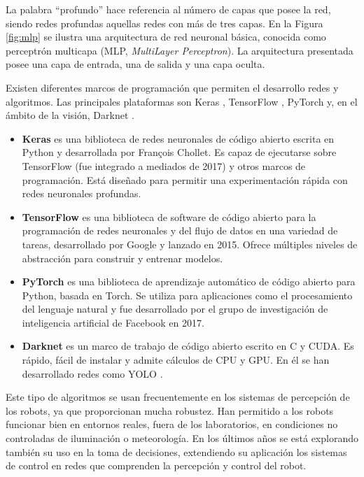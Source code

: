 \documentclass[../main.tex]{subfiles}
\begin{document}
La palabra ``profundo'' hace referencia al número de capas que posee la red, siendo redes profundas aquellas redes con más de tres capas. En la Figura \ref{fig:mlp} se ilustra una arquitectura de red neuronal básica, conocida como perceptrón multicapa (MLP, \emph{MultiLayer Perceptron}). La arquitectura presentada posee una capa de entrada, una de salida y una capa oculta.

Existen diferentes marcos de programación que permiten el desarrollo redes y algoritmos. Las principales plataformas son Keras \cite{keras}, TensorFlow \cite{tensorflow}, PyTorch \cite{pytorch} y, en el ámbito de la visión, Darknet \cite{darknet13}.

\begin{itemize}
    \item \textbf{Keras} es una biblioteca de redes neuronales de código abierto escrita en Python y desarrollada por François Chollet. Es capaz de ejecutarse sobre TensorFlow (fue integrado a mediados de 2017) y otros marcos de programación. Está diseñado para permitir una experimentación rápida con redes neuronales profundas.
    \item \textbf{TensorFlow} es una biblioteca de software de código abierto para la programación de redes neuronales y del flujo de datos en una variedad de tareas, desarrollado por Google y lanzado en 2015. Ofrece múltiples niveles de abstracción para construir y entrenar modelos.
    \item \textbf{PyTorch} es una biblioteca de aprendizaje automático de código abierto para Python, basada en Torch. Se utiliza para aplicaciones como el procesamiento del lenguaje natural y fue desarrollado por el grupo de investigación de inteligencia artificial de Facebook en 2017.
    \item \textbf{Darknet} es un marco de trabajo de código abierto escrito en C y CUDA. Es rápido, fácil de instalar y admite cálculos de CPU y GPU. En él se han desarrollado redes como YOLO \cite{yolov3}.
\end{itemize}

Este tipo de algoritmos se usan frecuentemente en los sistemas de percepción de los robots, ya que proporcionan mucha robustez. Han permitido a los robots funcionar bien en entornos reales, fuera de los laboratorios, en condiciones no controladas de iluminación o meteorología. En los últimos años se está explorando también su uso en la toma de decisiones, extendiendo su aplicación los sistemas de control en redes que comprenden la percepción y control del robot.
\end{document}
